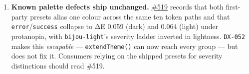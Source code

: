 \begin{enumerate}
  \textbf{Open \texttt{p\allowbreak{}r\allowbreak{}i\allowbreak{}o\allowbreak{}r\allowbreak{}i\allowbreak{}t\allowbreak{}y\allowbreak{}:\allowbreak{}h\allowbreak{}i\allowbreak{}g\allowbreak{}h} issue \#473} (\texttt{B\allowbreak{}A\allowbreak{}D\allowbreak{} \allowbreak{}C\allowbreak{}O\allowbreak{}D\allowbreak{}E\allowbreak{}:\allowbreak{} \allowbreak{}m\allowbreak{}a\allowbreak{}k\allowbreak{}e\allowbreak{} \allowbreak{}S\allowbreak{}V\allowbreak{}G\allowbreak{} \allowbreak{}p\allowbreak{}a\allowbreak{}t\allowbreak{}h\allowbreak{} \allowbreak{}p\allowbreak{}a\allowbreak{}r\allowbreak{}s\allowbreak{}i\allowbreak{}n\allowbreak{}g\allowbreak{} \allowbreak{}t\allowbreak{}o\allowbreak{}t\allowbreak{}a\allowbreak{}l\allowbreak{} \allowbreak{}a\allowbreak{}n\allowbreak{}d\allowbreak{} \allowbreak{}n\allowbreak{}o\allowbreak{}n\allowbreak{}-\allowbreak{}s\allowbreak{}t\allowbreak{}a\allowbreak{}l\allowbreak{}l\allowbreak{}i\allowbreak{}n\allowbreak{}g}) is milestoned \texttt{v\allowbreak{}8\allowbreak{}.\allowbreak{}2\allowbreak{}.\allowbreak{}0} and is not release-blocking for \texttt{8\allowbreak{}.\allowbreak{}0\allowbreak{}.\allowbreak{}0}. Named here rather than left implicit, per \texttt{R\allowbreak{}E\allowbreak{}L\allowbreak{}-\allowbreak{}G\allowbreak{}H\allowbreak{}-\allowbreak{}P\allowbreak{}R\allowbreak{}I\allowbreak{}O\allowbreak{}R\allowbreak{}I\allowbreak{}T\allowbreak{}Y\allowbreak{}-\allowbreak{}H\allowbreak{}I\allowbreak{}G\allowbreak{}H\allowbreak{}-\allowbreak{}Z\allowbreak{}E\allowbreak{}R\allowbreak{}O}.
\item
  \textbf{Known palette defects ship unchanged.} \href{https://github.com/flyingrobots/bijou/issues/519}{\#519} records that both first-party presets alias one colour across the same ten token paths and that \texttt{e\allowbreak{}r\allowbreak{}r\allowbreak{}o\allowbreak{}r}/\texttt{s\allowbreak{}u\allowbreak{}c\allowbreak{}c\allowbreak{}e\allowbreak{}s\allowbreak{}s} collapse to ΔE 0.059 (dark) and 0.064 (light) under protanopia, with \texttt{b\allowbreak{}i\allowbreak{}j\allowbreak{}o\allowbreak{}u\allowbreak{}-\allowbreak{}l\allowbreak{}i\allowbreak{}g\allowbreak{}h\allowbreak{}t}'s severity ladder inverted in lightness. \texttt{D\allowbreak{}X\allowbreak{}-\allowbreak{}0\allowbreak{}5\allowbreak{}2} makes this \emph{escapable} --- \texttt{e\allowbreak{}x\allowbreak{}t\allowbreak{}e\allowbreak{}n\allowbreak{}d\allowbreak{}T\allowbreak{}h\allowbreak{}e\allowbreak{}m\allowbreak{}e\allowbreak{}(\allowbreak{})} can now reach every group --- but does not fix it. Consumers relying on the shipped presets for severity distinctions should read \#519.
\end{enumerate}

